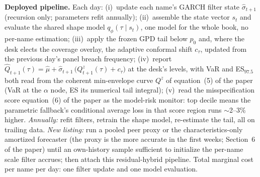 \documentclass[11pt]{article}
\begin{document}
\medskip\noindent\textbf{Deployed pipeline.} Each day: (i)~update each name's GARCH filter state
$\widehat\sigma_{t+1}$ (recursion only; parameters refit annually);
(ii)~assemble the state vector $s_t$ and evaluate the shared shape model $q_\phi(\tau\mid s_t)$, one model for the whole book, no
per-name estimation; (iii)~apply the frozen GPD tail below $p_0$
and, where the desk elects the coverage overlay, the adaptive conformal shift
$c_\tau$, updated from the previous day's panel breach frequency; (iv)~report
$\widehat Q_{t+1}(\tau) = \widehat\mu+\widehat\sigma_{t+1}\,\big(Q^{z}_{t+1}(\tau)+c_\tau\big)$
at the desk's levels, with VaR and ES$_{97.5}$ both read from the coherent
min-envelope curve $Q^{z}$ of equation~(5) of the paper (VaR at the $\alpha$
node, ES its numerical tail integral); (v)~read
the misspecification score equation~(6) of the paper as the model-risk monitor: top decile means the parametric fallback's conditional average loss
in that score region runs $\sim$2--3\% higher. \emph{Annually:} refit filters, retrain the shape model,
re-estimate the tail, all on trailing data. \emph{New listing:}
run a pooled peer proxy or the characteristics-only amortized forecaster (the proxy is the more accurate in the first weeks; Section~6 of the paper) until an
own-history sample sufficient to initialize the per-name scale filter
accrues; then attach this residual-hybrid pipeline. Total marginal
cost per name per day: one filter update and
one model evaluation.
\end{document}
